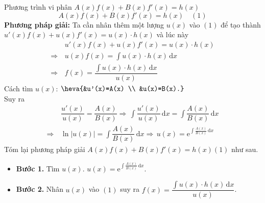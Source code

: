 \begin{dang}{Phương trình vi phân \boldmath $A(x)f(x)+B(x)f'(x)=h(x)$ \unboldmath}
	$$A(x)f(x)+B(x)f'(x)=h(x)\quad (1)$$
	\textbf{Phương pháp giải:} Ta cần nhân thêm một lượng $u(x)$ vào  $(1)$ để tạo thành $u'(x) f(x)+u(x) f'(x)=u(x) \cdot h(x)$ và lúc này
	\begin{align*}
		            & \, u'(x) f(x)+u(x) f'(x)=u(x) \cdot h(x)                  \\
		\Rightarrow & \, u(x) f(x)=\int u(x) \cdot h(x) \mathrm{\,d} x          \\
		\Rightarrow & \, f(x)=\dfrac{\int u(x) \cdot h(x) \mathrm{\,d} x}{u(x)}
	\end{align*}
	Cách tìm $u(x)$: $\heva{&u'(x)=A(x) \\ &u(x)=B(x).}$\\
	Suy ra
	\begin{align*}
		            & \,\dfrac{u'(x)}{u(x)}=\dfrac{A(x)}{B(x)}
		\Rightarrow \, \int \dfrac{u'(x)}{u(x)} \mathrm{\,d} x=\int \dfrac{A(x)}{B(x)} \mathrm{\,d} x \\
		\Rightarrow & \, \ln |u(x)|=\int \dfrac{A(x)}{B(x)} \mathrm{\,d} x
		\Rightarrow \, u(x)=\mathrm{e}^{\int\tfrac{A(x)}{B(x)} \mathrm{\,d} x}
	\end{align*}
	Tóm lại phương pháp giải $A(x)f(x)+B(x)f'(x)=h(x)$\quad $(1)$ như sau.
	\begin{itemize}
		\item \textbf{Bước 1.} Tìm $u(x)$. $u(x)=\mathrm{e}^{\int\tfrac{A(x)}{B(x)} \mathrm{\,d} x}$.
		\item \textbf{Bước 2.} Nhân $u(x)$ vào $(1)$ suy ra $f(x)=\dfrac{\int\limits u(x) \cdot h(x) \mathrm{\,d}x}{u(x)}$.
	\end{itemize}

\end{dang}

